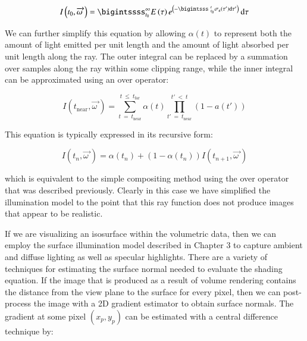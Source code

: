 \begin{equation}\label{eq:7.6}
I\left(t_0, \overrightarrow{\omega\ }\right) = \bigintssss_{t_0}^{\infty} E\left(\tau\right) e^{\left(-\bigintsss_{\ t_0}^{\ t} \sigma_\text{a}\left(\tau'\right)\text{d} \tau'\right)} \, \text{d}\tau
\end{equation}

We can further simplify this equation by allowing $α(t)$ to represent both the amount of light emitted per unit length and the amount of light absorbed per unit length along the ray. The outer integral can be replaced by a summation over samples along the ray within some clipping range, while the inner integral can be approximated using an over operator:

\begin{equation}\label{eq:7.7}
I(t_\text{near}, \overrightarrow{\omega\ }) = \sum_{t\ =\ t_\text{near}}^{t\ \leq\ t_\text{far}} \alpha(t) \prod_{t'\ =\ t_\text{near}}^{t'\ <\ t}\left(1 - a(t') \right)
\end{equation}

This equation is typically expressed in its recursive form:

\begin{equation}\label{eq:7.8}
I(t_n, \overrightarrow{\omega\ }) = \alpha(t_n) + \left(1 - \alpha(t_n) \right) I(t_{n + 1}, \overrightarrow{\omega\ })
\end{equation}

which is equivalent to the simple compositing method using the over operator that was described previously. Clearly in this case we have simplified the illumination model to the point that this ray function does not produce images that appear to be realistic.

If we are visualizing an isosurface within the volumetric data, then we can employ the surface illumination model described in Chapter 3 to capture ambient and diffuse lighting as well as specular highlights. There are a variety of techniques for estimating the surface normal needed to evaluate the shading equation. If the image that is produced as a result of volume rendering contains the distance from the view plane to the surface for every pixel, then we can post-process the image with a 2D gradient estimator to obtain surface normals. The gradient at some pixel $(x_p, y_p)$ can be estimated with a central difference technique by:


